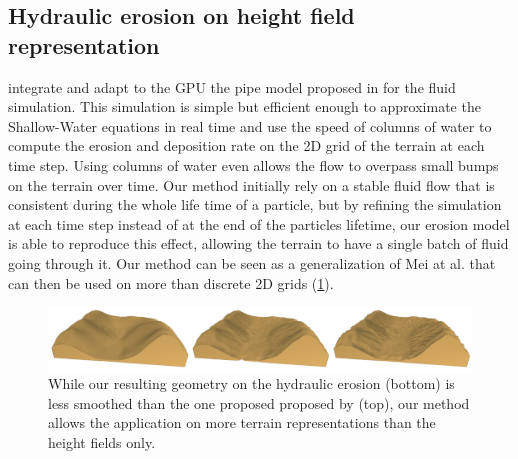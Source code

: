 \subsection{Hydraulic erosion on height field representation}
\citep{Mei2007} integrate and adapt to the GPU the pipe model proposed in \cite{OBrien1995} for the fluid simulation. This simulation is simple but efficient enough to approximate the Shallow-Water equations in real time and use the speed of columns of water to compute the erosion and deposition rate on the 2D grid of the terrain at each time step. Using columns of water even allows the flow to overpass small bumps on the terrain over time. Our method initially rely on a stable fluid flow that is consistent during the whole life time of a particle, but by refining the simulation at each time step instead of at the end of the particles lifetime, our erosion model is able to reproduce this effect, allowing the terrain to have a single batch of fluid going through it. Our method can be seen as a generalization of Mei at al. that can then be used on more than discrete 2D grids (\cref{fig:erosion_screen-mei2007-1}). 

\begin{figure}[ht]
    \centering
    \includegraphics[width= 1\linewidth]{hydro.pdf}
    \caption{While our resulting geometry on the hydraulic erosion (bottom) is less smoothed than the one proposed proposed by \cite{Mei2007} (top), our method allows the application on more terrain representations than the height fields only.}
    \label{fig:erosion_screen-mei2007-1}
\end{figure}

